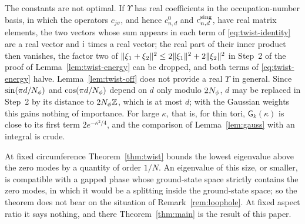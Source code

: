 \begin{remark}\label{rem:twist-constants}
The constants are not optimal. If $\Upsilon$ has real coefficients in the occupation-number basis, in which the
operators $c_{j\sigma}$, and hence $c^0_{n,d}$ and $c^{\rm sing}_{n,d}$, have real matrix elements, the two vectors whose sum
appears in each term of \eqref{eq:twist-identity} are a real vector and $\mathrm{i}$ times a real vector; the real part of
their inner product then vanishes, the factor two of $\lVert\xi_1+\xi_2\rVert^2\le2\lVert\xi_1\rVert^2+2\lVert\xi_2\rVert^2$ in Step~2 of the
proof of Lemma~\ref{lem:twist-energy} can be dropped, and both terms of \eqref{eq:twist-energy} halve. Lemma~\ref{lem:twist-off} does not provide a real $\Upsilon$ in general. Since
$\sin(\pi d/N_{\phi})$ and $\cos(\pi d/N_{\phi})$ depend on $d$ only modulo $2N_{\phi}$, $d$ may be replaced in Step~2 by its distance
to $2N_{\phi}\mathbb{Z}$, which is at most $d$; with the Gaussian weights this gains nothing of importance. For large $\kappa$, that
is, for thin tori, $\mathsf G_k(\kappa)$ is close to its first term $2e^{-\kappa^2/4}$, and the comparison of
Lemma~\ref{lem:gauss} with an integral is crude.
\end{remark}

\begin{remark}\label{rem:twist-scope}
At fixed circumference Theorem~\ref{thm:twist} bounds the lowest eigenvalue above the zero modes by a quantity of order
$1/N$. An eigenvalue of this size, or smaller, is compatible with a gapped phase whose ground-state space strictly
contains the zero modes, in which it would be a splitting inside the ground-state space; so the theorem does not bear on
the situation of Remark~\ref{rem:loophole}. At fixed aspect ratio it says nothing,
and there Theorem~\ref{thm:main} is the result of this paper.
\end{remark}
